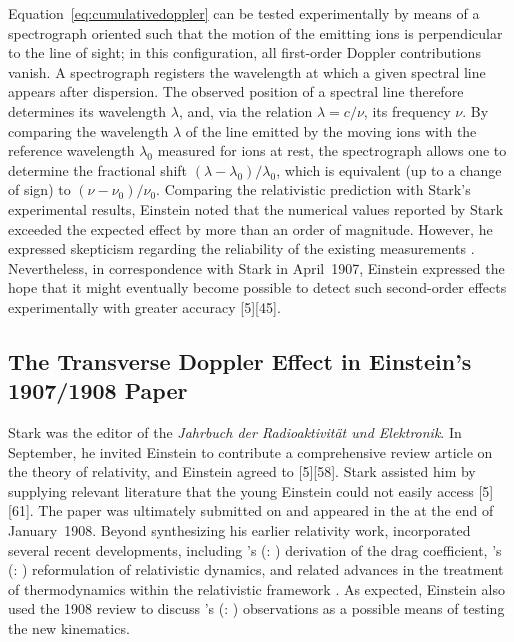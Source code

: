 \documentclass[pdflatex]{sn-jnl}
\newcommand{\TDE}{Transverse Doppler Effect\xspace}
\renewcommand{\citets}[2][]{\citeauthor{#2}'s (\citeyear{#2}\if\relax\detokenize{#1}\relax\else: #1\fi)}
\begin{document}
Equation~\eqref{eq:cumulativedoppler} can be tested experimentally by means of a spectrograph oriented such that the motion of the emitting ions is perpendicular to the line of sight; in this configuration, all first-order Doppler contributions vanish. A spectrograph registers the wavelength at which a given spectral line appears after dispersion. The observed position of a spectral line therefore determines its wavelength $\lambda$, and, via the relation $\lambda = c/\nu$, its frequency $\nu$. By comparing the wavelength $\lambda$ of the line emitted by the moving ions with the reference wavelength $\lambda_0$ measured for ions at rest, the spectrograph allows one to determine the fractional shift $(\lambda-\lambda_0)/\lambda_0$, which is equivalent (up to a change of sign) to $(\nu-\nu_0)/\nu_0$. Comparing the relativistic prediction with Stark’s experimental results, Einstein noted that the numerical values reported by Stark exceeded the expected effect by more than an order of magnitude. However, he expressed skepticism regarding the reliability of the existing measurements \citep[198]{Einstein1907d}. Nevertheless, in correspondence with Stark in April~1907, Einstein expressed the hope that it might eventually become possible to detect such second-order effects experimentally with greater accuracy [5][45].

\medskip


\subsection{The \TDE{} in Einstein’s 1907/1908  Paper}
%
Stark was the editor of the \emph{Jahrbuch der Radioaktivität und Elektronik}. In September, he invited Einstein to contribute a comprehensive review article on the theory of relativity, and Einstein agreed to  [5][58]. Stark assisted him by supplying relevant literature that the young Einstein could not easily access [5][61]. The paper was ultimately submitted on  and appeared in the  at the end of January~1908. Beyond synthesizing his earlier relativity work, \citet{Einstein1908} incorporated several recent developments, including \citets{Laue1907} derivation of the drag coefficient, \citets{Planck1906a} reformulation of relativistic dynamics, and related advances in the treatment of thermodynamics within the relativistic framework \citep{Planck1907}. As expected, Einstein also used the 1908 review to discuss \citets{Stark1906} observations as a possible means of testing the new kinematics.
\end{document}
